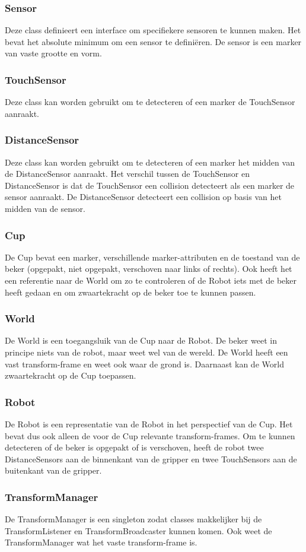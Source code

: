 \documentclass[11pt,titlepage]{article}
\begin{document}
\subsubsection{Sensor}
Deze class definieert een interface om specifiekere sensoren te kunnen maken. Het bevat het absolute minimum om een sensor te definiëren. De sensor is een marker van vaste grootte en vorm.

\subsubsection{TouchSensor}
Deze class kan worden gebruikt om te detecteren of een marker de TouchSensor aanraakt.

\subsubsection{DistanceSensor}
Deze class kan worden gebruikt om te detecteren of een marker het midden van de DistanceSensor aanraakt. Het verschil tussen de TouchSensor en DistanceSensor is dat de TouchSensor een collision detecteert als een marker de sensor aanraakt. De DistanceSensor detecteert een collision op basis van het midden van de sensor.

\subsubsection{Cup}
De Cup bevat een marker, verschillende marker-attributen en de toestand van de beker (opgepakt, niet opgepakt, verschoven naar links of rechts). Ook heeft het een referentie naar de World om zo te controleren of de Robot iets met de beker heeft gedaan en om zwaartekracht op de beker toe te kunnen passen.

\subsubsection{World}
De World is een toegangsluik van de Cup naar de Robot. De beker weet in principe niets van de robot, maar weet wel van de wereld. De World heeft een vast transform-frame en weet ook waar de grond is. Daarnaast kan de World zwaartekracht op de Cup toepassen.

\subsubsection{Robot}
De Robot is een representatie van de Robot in het perspectief van de Cup. Het bevat dus ook alleen de voor de Cup relevante transform-frames. Om te kunnen detecteren of de beker is opgepakt of is verschoven, heeft de robot twee DistanceSensors aan de binnenkant van de gripper en twee TouchSensors aan de buitenkant van de gripper.

\subsubsection{TransformManager}
De TransformManager is een singleton zodat classes makkelijker bij de TransformListener en TransformBroadcaster kunnen komen. Ook weet de TransformManager wat het vaste transform-frame is.
\end{document}
